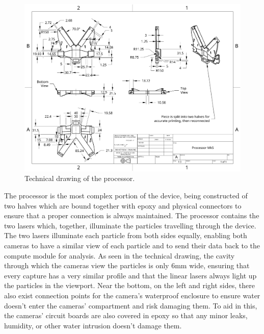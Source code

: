 \documentclass[fleqn,10pt]{SelfArx} %
\begin{document}
		\begin{figure}[h]
			\centering
			\includegraphics[width=1\linewidth]{Figures/TechProcessor}
			\caption[Processor Tech. Drawing]{Technical drawing of the processor.}
			\label{fig:techprocessor}
		\end{figure}
			The processor is the most complex portion of the device, being constructed of two halves which are bound together with epoxy and physical connectors to ensure that a proper connection is always maintained. The processor contains the two lasers which, together, illuminate the particles travelling through the device. The two lasers illuminate each particle from both sides equally, enabling both cameras to have a similar view of each particle and to send their data back to the compute module for analysis. As seen in the technical drawing, the cavity through which the cameras view the particles is only 6mm wide, ensuring that every capture has a very similar profile and that the linear lasers always light up the particles in the viewport. Near the bottom, on the left and right sides, there also exist connection points for the camera’s waterproof enclosure to ensure water doesn’t enter the cameras’ compartment and risk damaging them. To aid in this, the cameras’ circuit boards are also covered in epoxy so that any minor leaks, humidity, or other water intrusion doesn’t damage them. 
\end{document}

